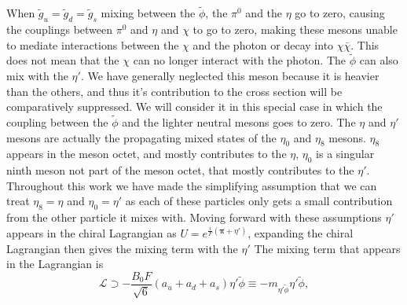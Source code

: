 When $\tilde{g}_u=\tilde{g}_d=\tilde{g}_s$ mixing between the $\tilde{\phi}$, the $\pi^0$ and the $\eta$ go to zero, causing the couplings between $\pi^0$ and $\eta$ and $\chi$ to go to zero, making these mesons unable to mediate interactions between the $\chi$ and the photon or decay into $\chi\bar{\chi}$.  This does not mean that the $\chi$ can no longer interact with the photon.  The $\tilde{\phi}$ can also mix with the $\eta'$.  We have generally neglected this meson because it is heavier than the others, and thus it's contribution to the cross section will be comparatively suppressed. We will consider it in this special case in which the coupling between the $\tilde{\phi}$ and the lighter neutral mesons goes to zero.   The $\eta$ and $\eta'$ mesons are actually the propagating mixed states of the $\eta_0$ and $\eta_8$ mesons.  $\eta_8$  appears in the meson octet, and mostly contributes to the $\eta$, $\eta_0$ is a singular ninth meson not part of the meson octet, that mostly contributes to the $\eta'$.  Throughout this work we have made the simplifying assumption that we can treat $\eta_8=\eta$ and $\eta_0=\eta'$ as each of these particles only gets a small contribution from the other particle it mixes with. Moving forward with these assumptions $\eta'$  appears in the chiral Lagrangian as $U = e^{\frac{i}{F}(\boldsymbol{\pi}+\eta')}$, expanding the chiral Lagrangian then gives the mixing term with the $\eta'$
The mixing term that appears in the Lagrangian is
\begin{equation}
    \mathcal{L}\supset-\frac{B_{0}F}{\sqrt{6}}(a_u+a_d+a_s)\eta'\tilde{\phi}\equiv -m_{\eta'\tilde{\phi}}\eta'\tilde{\phi},
\end{equation}

